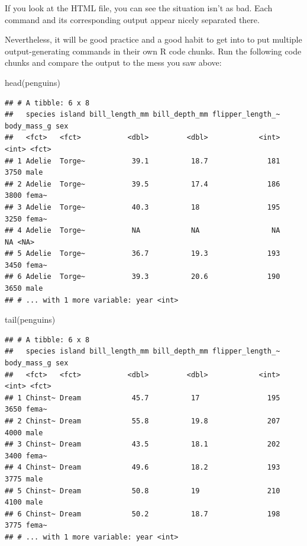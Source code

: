 \documentclass[
]{book}
\newenvironment{Shaded}{\begin{snugshade}}{\end{snugshade}}
\newcommand{\FunctionTok}[1]{\textcolor[rgb]{0.00,0.00,0.00}{#1}}
\newcommand{\NormalTok}[1]{#1}
\begin{document}
If you look at the HTML file, you can see the situation isn't as bad. Each command and its corresponding output appear nicely separated there.

Nevertheless, it will be good practice and a good habit to get into to put multiple output-generating commands in their own R code chunks. Run the following code chunks and compare the output to the mess you saw above:

\begin{Shaded}
\begin{Highlighting}[]
\FunctionTok{head}\NormalTok{(penguins)}
\end{Highlighting}
\end{Shaded}

\begin{verbatim}
## # A tibble: 6 x 8
##   species island bill_length_mm bill_depth_mm flipper_length_~ body_mass_g sex  
##   <fct>   <fct>           <dbl>         <dbl>            <int>       <int> <fct>
## 1 Adelie  Torge~           39.1          18.7              181        3750 male 
## 2 Adelie  Torge~           39.5          17.4              186        3800 fema~
## 3 Adelie  Torge~           40.3          18                195        3250 fema~
## 4 Adelie  Torge~           NA            NA                 NA          NA <NA> 
## 5 Adelie  Torge~           36.7          19.3              193        3450 fema~
## 6 Adelie  Torge~           39.3          20.6              190        3650 male 
## # ... with 1 more variable: year <int>
\end{verbatim}

\begin{Shaded}
\begin{Highlighting}[]
\FunctionTok{tail}\NormalTok{(penguins)}
\end{Highlighting}
\end{Shaded}

\begin{verbatim}
## # A tibble: 6 x 8
##   species island bill_length_mm bill_depth_mm flipper_length_~ body_mass_g sex  
##   <fct>   <fct>           <dbl>         <dbl>            <int>       <int> <fct>
## 1 Chinst~ Dream            45.7          17                195        3650 fema~
## 2 Chinst~ Dream            55.8          19.8              207        4000 male 
## 3 Chinst~ Dream            43.5          18.1              202        3400 fema~
## 4 Chinst~ Dream            49.6          18.2              193        3775 male 
## 5 Chinst~ Dream            50.8          19                210        4100 male 
## 6 Chinst~ Dream            50.2          18.7              198        3775 fema~
## # ... with 1 more variable: year <int>
\end{verbatim}
\end{document}

